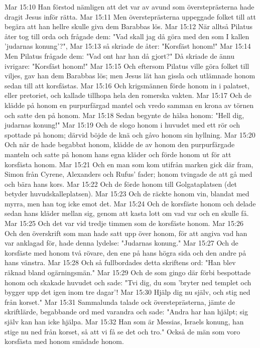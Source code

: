 Mar 15:10  Han förstod nämligen att det var av avund som översteprästerna hade dragit Jesus inför rätta.
Mar 15:11  Men översteprästerna uppeggade folket till att begära att han hellre skulle giva dem Barabbas lös.
Mar 15:12  När alltså Pilatus åter tog till orda och frågade dem: "Vad skall jag då göra med den som I kallen 'judarnas konung'?",
Mar 15:13  så skriade de åter: "Korsfäst honom!"
Mar 15:14  Men Pilatus frågade dem: "Vad ont har han då gjort?" Då skriade de ännu ivrigare: "Korsfäst honom!"
Mar 15:15  Och eftersom Pilatus ville göra folket till viljes, gav han dem Barabbas lös; men Jesus lät han gissla och utlämnade honom sedan till att korsfästas.
Mar 15:16  Och krigsmännen förde honom in i palatset, eller pretoriet, och kallade tillhopa hela den romerska vakten.
Mar 15:17  Och de klädde på honom en purpurfärgad mantel och vredo samman en krona av törnen och satte den på honom.
Mar 15:18  Sedan begynte de hälsa honom: "Hell dig, judarnas konung!"
Mar 15:19  Och de slogo honom i huvudet med ett rör och spottade på honom; därvid böjde de knä och gåvo honom sin hyllning.
Mar 15:20  Och när de hade begabbat honom, klädde de av honom den purpurfärgade manteln och satte på honom hans egna kläder och förde honom ut för att korsfästa honom.
Mar 15:21  Och en man som kom utifrån marken gick där fram, Simon från Cyrene, Alexanders och Rufus' fader; honom tvingade de att gå med och bära hans kors.
Mar 15:22  Och de förde honom till Golgataplatsen (det betyder huvudskalleplatsen).
Mar 15:23  Och de räckte honom vin, blandat med myrra, men han tog icke emot det.
Mar 15:24  Och de korsfäste honom och delade sedan hans kläder mellan sig, genom att kasta lott om vad var och en skulle få.
Mar 15:25  Och det var vid tredje timmen som de korsfäste honom.
Mar 15:26  Och den överskrift som man hade satt upp över honom, för att angiva vad han var anklagad för, hade denna lydelse: "Judarnas konung."
Mar 15:27  Och de korsfäste med honom två rövare, den ene på hans högra sida och den andre på hans vänstra.
Mar 15:28  Och så fullbordades detta skriftens ord: "Han blev räknad bland ogärningsmän."
Mar 15:29  Och de som gingo där förbi bespottade honom och skakade huvudet och sade: "Tvi dig, du som 'bryter ned templet och bygger upp det igen inom tre dagar'!
Mar 15:30  Hjälp dig nu själv, och stig ned från korset."
Mar 15:31  Sammalunda talade ock översteprästerna, jämte de skriftlärde, begabbande ord med varandra och sade: "Andra har han hjälpt; sig själv kan han icke hjälpa.
Mar 15:32  Han som är Messias, Israels konung, han stige nu ned från korset, så att vi få se det och tro." Också de män som voro korsfästa med honom smädade honom.
